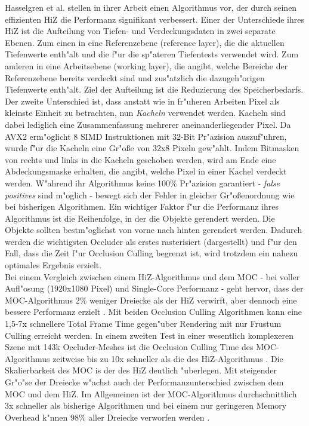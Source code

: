 \documentclass[journal]{vgtc}
\begin{document}
Hasselgren et al. \cite{MSOC} stellen in ihrer Arbeit einen Algorithmus vor, der durch seinen effizienten HiZ die Performanz signifikant verbessert.
Einer der Unterschiede ihres HiZ ist die Aufteilung von Tiefen- und Verdeckungsdaten in zwei separate Ebenen.
Zum einen in eine Referenzebene (reference layer), die die aktuellen Tiefenwerte enth"alt und die f"ur die sp"ateren Tiefentests verwendet wird.
Zum anderen in eine Arbeitsebene (working layer), die angibt, welche Bereiche der Referenzebene bereits verdeckt sind und zus"atzlich die dazugeh"origen Tiefenwerte enth"alt.
Ziel der Aufteilung ist die Reduzierung des Speicherbedarfs.
Der zweite Unterschied ist, dass anstatt wie in fr"uheren Arbeiten Pixel als kleinste Einheit zu betrachten, nun \textit{Kacheln} verwendet werden.
Kacheln sind dabei lediglich eine Zusammenfassung mehrerer aneinanderliegender Pixel.
Da AVX2 erm"oglicht 8 SIMD Instruktionen mit 32-Bit Pr"azision auszuf"uhren, wurde f"ur die Kacheln eine Gr"o\ss{}e von 32x8 Pixeln gew"ahlt.
Indem Bitmasken von rechts und links in die Kacheln geschoben werden, wird am Ende eine Abdeckungsmaske erhalten, die angibt, welche Pixel in einer Kachel verdeckt werden.
W"ahrend ihr Algorithmus keine 100\% Pr"azision garantiert - \textit{false positives} sind m"oglich - bewegt sich der Fehler in gleicher Gr"o\ss{}enordnung wie bei bisherigen Algorithmen.
Ein wichtiger Faktor f"ur die Performanz ihres Algorithmus ist die Reihenfolge, in der die Objekte gerendert werden.
Die Objekte sollten bestm"oglichst von vorne nach hinten gerendert werden.
Dadurch werden die wichtigsten Occluder als erstes rasterisiert (dargestellt) und f"ur den Fall, dass die Zeit f"ur Occlusion Culling begrenzt ist, wird trotzdem ein nahezu optimales Ergebnis erzielt.\\

Bei einem Vergleich zwischen einem HiZ-Algorithmus und dem MOC - bei voller Aufl"osung (1920x1080 Pixel) und Single-Core Performanz - geht hervor, dass der MOC-Algorithmus 2\% weniger Dreiecke als der HiZ verwirft, aber dennoch eine bessere Performanz erzielt \cite{MSOC}.
Mit beiden Occlusion Culling Algorithmen kann eine 1,5-7x schnellere Total Frame Time gegen"uber Rendering mit nur Frustum Culling erreicht werden.
In einem zweiten Test in einer wesentlich komplexeren Szene mit 143k Occluder-Meshes ist die Occlusion Culling Time des MOC-Algorithmus zeitweise bis zu 10x schneller als die des HiZ-Algorithmus \cite{MSOC}.
Die Skalierbarkeit des MOC is der des HiZ deutlich "uberlegen. Mit steigender Gr"o"se der Dreiecke w"achst auch der Performanzunterschied zwischen dem MOC und dem HiZ.
Im Allgemeinen ist der MOC-Algorithmus durchschnittlich 3x schneller als bisherige Algorithmen und bei einem nur geringeren Memory Overhead k"nnen 98\% aller Dreiecke verworfen werden \cite{MSOC}.
\end{document}
